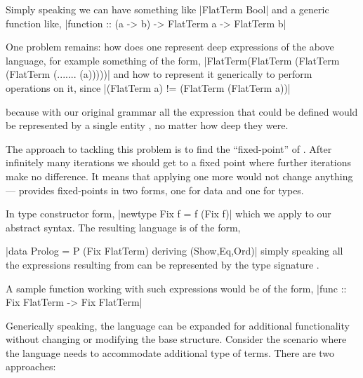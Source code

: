 \documentclass[thesis-solanki.tex]{subfiles}
\begin{document}
Simply speaking we can have something like
|FlatTerm Bool|
\noindent and a generic function like,
|function :: (a -> b) -> FlatTerm a -> FlatTerm b|

One problem remains: how does one represent deep expressions
of the above language,
for example something of the form,
|FlatTerm(FlatTerm (FlatTerm (FlatTerm (....... (a)))))|
\noindent and how to represent it generically to perform operations on it, since
|(FlatTerm a) != (FlatTerm (FlatTerm a))|

%
\noindent because with our original grammar all the expression that could be defined would be represented by a single entity
, no matter how deep they were.

The approach to tackling this problem is to find the ``fixed-point'' of .
After infinitely many iterations we should get to a fixed point where further iterations make no
difference.
It means that applying one more  would not change anything---%
 provides fixed-points in two forms, one for data and one for types.

In type constructor form,
|newtype Fix f = f (Fix f)|
which we apply to our abstract syntax.
\newline
\noindent The resulting language is of the form,

|data Prolog = P (Fix FlatTerm) deriving (Show,Eq,Ord)|
%
\noindent simply speaking all the expressions resulting from  can be represented  by the type
signature .

A sample function working with such expressions would be of the form,
|func :: Fix FlatTerm -> Fix FlatTerm|


Generically speaking, the language can be expanded for additional functionality without changing or modifying the
base structure.
Consider the scenario where the language needs to accommodate additional type of terms. There are two approaches:
\end{document}
